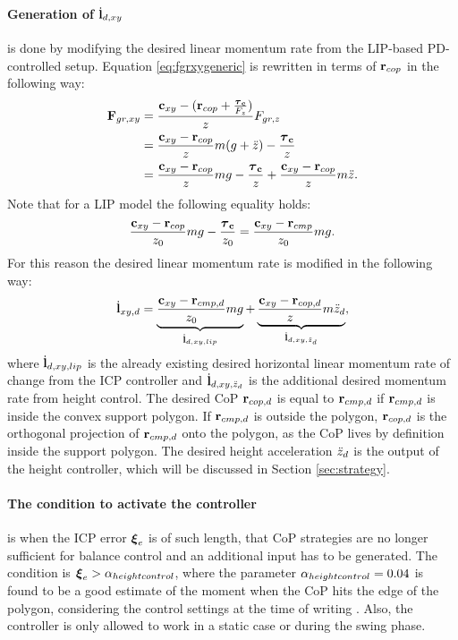 \paragraph{Generation of $\dot{\mathbf{l}}_{d,xy}$} is done by modifying the desired linear momentum rate from the \ac{LIP}-based PD-controlled setup. Equation \eqref{eq:fgrxygeneric} is rewritten in terms of $\mathbf{r}_{cop}$ in the following way:
\begin{align}
\mathbf{F}_{gr,xy}&=\frac{\mathbf{c}_{xy}-(\mathbf{r}_{cop}+\frac{\boldsymbol{\tau}_{\mathbf{c}}}{F_z})}{z}F_{gr,z} \\
&=\frac{\mathbf{c}_{xy}-\mathbf{r}_{cop}}{z}m(g+\ddot{z}) - \frac{\boldsymbol{\tau}_{\mathbf{c}}}{z} \\
&=\frac{\mathbf{c}_{xy}-\mathbf{r}_{cop}}{z}mg - \frac{\boldsymbol{\tau}_{\mathbf{c}}}{z} + \frac{\mathbf{c}_{xy}-\mathbf{r}_{cop}}{z}m\ddot{z}.
\end{align}
Note that for a \ac{LIP} model the following equality holds:
\begin{equation}
	\frac{\mathbf{c}_{xy}-\mathbf{r}_{cop}}{z_0}mg - \frac{\boldsymbol{\tau}_{\mathbf{c}}}{z_0} = \frac{\mathbf{c}_{xy}-\mathbf{r}_{cmp}}{z_0}mg.
\end{equation}
For this reason the desired linear momentum rate is modified in the following way:
 \begin{equation}
\dot{\mathbf{l}}_{xy,d}=\underbrace{ \frac{\mathbf{c}_{xy}-\mathbf{r}_{cmp,d}} {z_0}mg}_{\dot{\mathbf{l}}_{d,xy,lip}}  + \underbrace{\frac{\mathbf{c}_{xy}-\mathbf{r}_{cop,d}}{z}m\ddot{z}_d}_{\dot{\mathbf{l}}_{d,xy,\ddot{z}_d}},
\end{equation}
where $\dot{\mathbf{l}}_{d,xy,lip}$ is the already existing desired horizontal linear momentum rate of change from the \ac{ICP} controller and $\dot{\mathbf{l}}_{d,xy,\ddot{z}_d}$ is the additional desired momentum rate from height control. The desired \ac{CoP} $\mathbf{r}_{cop,d}$ is equal to $\mathbf{r}_{cmp,d}$ if $\mathbf{r}_{cmp,d}$ is inside the convex support polygon. If $\mathbf{r}_{cmp,d}$ is outside the polygon, $\mathbf{r}_{cop,d}$ is the orthogonal projection of $\mathbf{r}_{cmp,d}$ onto the polygon, as the \ac{CoP} lives by definition inside the support polygon. The desired height acceleration $\ddot{z}_d$ is the output of the height controller, which will be discussed in Section \ref{sec:strategy}.
\paragraph{The condition to activate the controller} is when the \ac{ICP} error $\boldsymbol{\xi}_e$ is of such length, that \ac{CoP} strategies are no longer sufficient for balance control and an additional input has to be generated. The condition is $\boldsymbol{\xi}_e>\alpha_{heightcontrol}$, where the parameter $\alpha_{heightcontrol}=0.04$ is found to be a good estimate of the moment when the \ac{CoP} hits the edge of the polygon, considering the control settings at the time of writing . Also, the controller is only allowed to work in a static case or during the swing phase.

